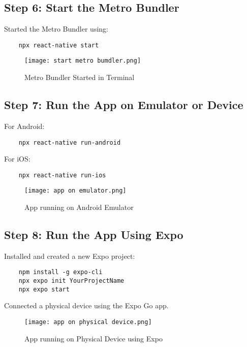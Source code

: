 \documentclass{article}
\begin{document}
\subsection{Step 6: Start the Metro Bundler}
Started the Metro Bundler using:
\begin{verbatim}
    npx react-native start
\end{verbatim}

\begin{figure}[H]
    \centering
    \texttt{[image: start metro bumdler.png]}
    \caption{Metro Bundler Started in Terminal}
    \label{fig:metro_bundler}
\end{figure}

\subsection{Step 7: Run the App on Emulator or Device}
For Android:
\begin{verbatim}
    npx react-native run-android
\end{verbatim}
For iOS:
\begin{verbatim}
    npx react-native run-ios
\end{verbatim}

\begin{figure}[H]
    \centering
    \texttt{[image: app on emulator.png]}
    \caption{App running on Android Emulator}
    \label{fig:emulator}
\end{figure}

\subsection{Step 8: Run the App Using Expo}
Installed and created a new Expo project:
\begin{verbatim}
    npm install -g expo-cli
    npx expo init YourProjectName
    npx expo start
\end{verbatim}
Connected a physical device using the Expo Go app.

\begin{figure}[H]
    \centering
    \texttt{[image: app on physical device.png]}
    \caption{App running on Physical Device using Expo}
    \label{fig:expo_device}
\end{figure}
\end{document}
